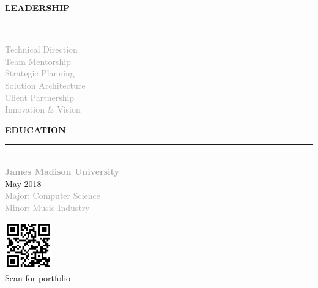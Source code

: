 \documentclass[10pt,letterpaper]{article}
\newcommand{\sidebarheader}[1]{%
    \vspace{8pt}
    {\headingfont\small\textcolor{accent}{\MakeUppercase{\textbf{#1}}}}
    \vspace{2pt}
    \par\noindent\textcolor{accent}{\rule{\linewidth}{1.5pt}}
    \vspace{3pt}
}
\begin{document}
{\begin{minipage}[t][10.5in][t]{2.7in}
\begin{minipage}{2.1in}
\sidebarheader{Leadership}
{\scriptsize\textcolor{darkgray}{\\[-6pt]
Technical Direction\\[3pt]
Team Mentorship\\[3pt]
Strategic Planning\\[3pt]
Solution Architecture\\[3pt]
Client Partnership\\[3pt]
Innovation \& Vision\\[3pt]
}}

\sidebarheader{Education}
{\footnotesize\\[-6pt]
\textbf{\textcolor{darkgray}{James Madison University}}\\[3pt]
\textcolor{mediumgray}{May 2018}\\[3pt]
\textcolor{darkgray}{Major: Computer Science\\[3pt]
Minor: Music Industry\\[3pt]}
}

\vspace{10pt}

\begin{center}
\includegraphics[width=0.8in]{qr_code.png}\\[3pt]
{\tiny\textcolor{mediumgray}{Scan for portfolio}}
\end{center}

\end{minipage}
\end{minipage}%
}%
\hspace{0pt}%
\end{document}
